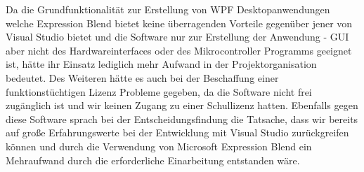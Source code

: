 \begin{itemize}
Da die Grundfunktionalität zur Erstellung von WPF Desktopanwendungen welche Expression Blend bietet keine überragenden Vorteile gegenüber jener von Visual Studio bietet und die Software nur zur Erstellung der Anwendung - GUI aber nicht des Hardwareinterfaces oder des Mikrocontroller Programms geeignet ist, hätte ihr Einsatz lediglich mehr Aufwand in der Projektorganisation bedeutet.
Des Weiteren hätte es auch bei der Beschaffung einer funktionstüchtigen Lizenz Probleme gegeben, da die Software nicht frei zugänglich ist und wir keinen Zugang zu einer Schullizenz hatten.
Ebenfalls gegen diese Software sprach bei der Entscheidungsfindung die Tatsache, dass wir bereits auf große Erfahrungswerte bei der Entwicklung mit Visual Studio zurückgreifen können und durch die Verwendung von Microsoft Expression Blend ein Mehraufwand durch die erforderliche Einarbeitung entstanden wäre.
\end{itemize}
